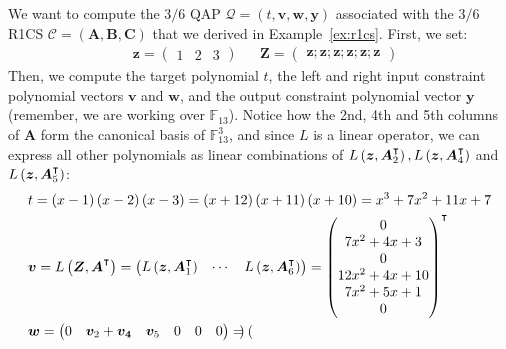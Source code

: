 \begin{example}
	We want to compute the \(3/6\) QAP \(\mathcal{Q} = \left(t, \bm{v}, \bm{w}, \bm{y}\right)\)
	associated with the \(3/6\) R1CS \(\mathcal{C} = \left(\bm{A}, \bm{B}, \bm{C}\right)\) that we
	derived in Example~\ref{ex:r1cs}.
	First, we set:
	\begin{align*}
		 & \bm{z} = \begin{pmatrix}1 & 2 & 3\end{pmatrix} &  &
		\bm{Z} = \begin{pmatrix}\bm{z}; \bm{z}; \bm{z}; \bm{z}; \bm{z}; \bm{z}\end{pmatrix}
	\end{align*}
	Then, we compute the target polynomial \(t\), the left and right input constraint polynomial
	vectors \(\bm{v}\) and \(\bm{w}\), and the output constraint polynomial vector \(\bm{y}\)
	(remember, we are working over \(\mathbb{F}_{13}\)).
	Notice how the 2nd, 4th and 5th columns of \(\bm{A}\) form the canonical basis of
	\(\mathbb{F}_{13}^3\), and since \(L\) is a linear operator, we can express all other polynomials
	as linear combinations of \(L\left(\bm{z}, \bm{A}_2^{\transpose}\right), L\left(\bm{z},
	\bm{A}_4^{\transpose}\right)\) and \(L\left(\bm{z}, \bm{A}_5^{\transpose}\right)\):
	\begin{align*}
		 & t	 = \left(x - 1\right)\left(x - 2\right)\left(x - 3\right) =
		\left(x + 12\right)\left(x + 11\right)\left(x + 10\right) = x^3 + 7x^2 + 11x + 7 \\
		 & \bm{v} = L\left(\bm{Z}, \bm{A}^{\transpose}\right) =
		\begin{pmatrix}
			L\left(\bm{z}, \bm{A}^{\transpose}_{1}\right) & \cdots &
			L\left(\bm{z}, \bm{A}^{\transpose}_{6}\right)
		\end{pmatrix}
		= {\begin{pmatrix}
			   0               \\
			   7x^2 + 4x + 3   \\
			   0               \\
			   12x^2 + 4x + 10 \\
			   7x^2 + 5x + 1   \\
			   0
		   \end{pmatrix}}^\transpose                                             \\
		 & \bm{w} =
		\begin{pmatrix}
			0 & \bm{v}_2 + \bm{v_4} & \bm{v}_5 & 0 & 0 & 0
		\end{pmatrix}
		= {\begin{pmatrix}

\end{pmatrix}}
\end{align*}
\end{example}

